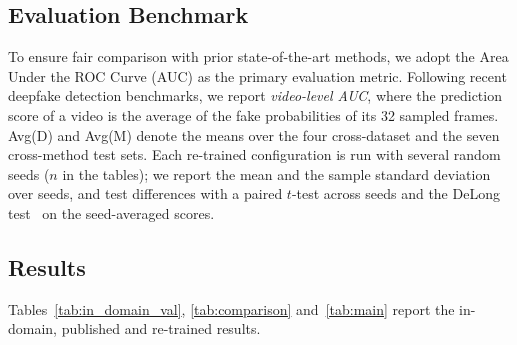 \documentclass[fonts]{icst}
\begin{document}
\subsection{Evaluation Benchmark}

To ensure fair comparison with prior state-of-the-art methods, we adopt the Area Under the ROC Curve (AUC) as the primary evaluation metric.
Following recent deepfake detection benchmarks, we report \textit{video-level AUC}, where the prediction score of a video is the average of the fake probabilities of its 32 sampled frames.
Avg(D) and Avg(M) denote the means over the four cross-dataset and the seven cross-method test sets.
Each re-trained configuration is run with several random seeds ($n$ in the tables); we report the mean and the sample standard deviation over seeds, and test differences with a paired $t$-test across seeds and the DeLong test~\cite{delong1988} on the seed-averaged scores.

\subsection{Results}
\label{sec:main}

Tables~\ref{tab:in_domain_val}, \ref{tab:comparison} and~\ref{tab:main} report the in-domain, published and re-trained results.

\begin{table}[H]
\centering
\caption{In-domain video AUC (\%) on the four manipulation subsets of the FF++ c23 test set (seed means, all models re-trained under our protocol).}
\label{tab:in_domain_val}
\label{tab:indomain}
\resizebox{\columnwidth}{!}{}
\end{table}

\begin{table}[t]
\centering
\captionsetup{labelsep=period, labelfont=bf, hypcap=false}
\caption{Benchmarking results of cross-dataset evaluations (Protocol-2) and cross-method evaluations (Protocol-3).
All detectors are trained on FF++ c23~\cite{rossler2019ff} and evaluated on other fake data.
The results of other methods are taken from Table~1 of Effort~\cite{yan2025effort}, and the Forensics Adapter and GenD rows from their papers; $\dagger$ marks the authors' released checkpoints.
These numbers come from different training recipes and checkpoint-selection rules (Sec.~\ref{sec:selection}), whereas our row is selected on FF++ validation only and averaged over $n$ seeds. Bold: best; shaded: second best.}
\label{tab:comparison}
\label{tab:literature}
\vspace{2mm}
\resizebox{\textwidth}{!}{}
\end{table}
\end{document}
